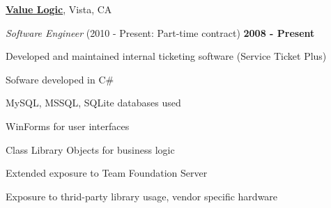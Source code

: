 \documentclass[10pt]{article}
\newcommand{\halfblankline}{\quad\vspace{-0.5\baselineskip}\pagebreak[3]}
\begin{document}
\href{http://www.valuelogic.com/}{\textbf{Value Logic}}, Vista, CA
\begin{outerlist}
  \item[] \textit{Software Engineer}
  \hfill (2010 - Present: Part-time contract)
  \hfill \textbf{2008 - Present}
  \begin{innerlist}
  \item Developed and maintained internal ticketing software (Service Ticket Plus)
  \begin{innerlist}
    \item Sofware developed in C\#
    \item MySQL, MSSQL, SQLite databases used
    \item WinForms for user interfaces
    \item Class Library Objects for business logic
  \end{innerlist}
  \item Extended exposure to Team Foundation Server
  \item Exposure to thrid-party library usage, vendor specific hardware
  \end{innerlist}
\end{outerlist}

\halfblankline
\end{document}
